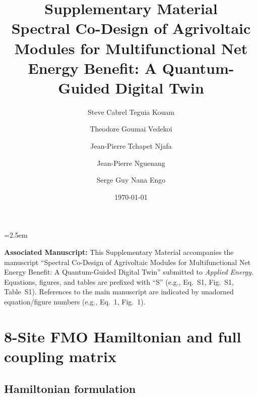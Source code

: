 \documentclass[11pt,a4paper]{article}
\begin{document}
\emergencystretch=2.5em

\title{\textbf{Supplementary Material}\\[0.5em]
\large Spectral Co-Design of Agrivoltaic Modules for Multifunctional Net Energy Benefit: A Quantum-Guided Digital Twin}

\author{Steve Cabrel Teguia Kouam}

\author{Theodore Goumai Vedekoi}
\author{Jean-Pierre Tchapet Njafa}
\author{Jean-Pierre Nguenang}
\author{Serge Guy Nana Engo}
\date{\today}

\maketitle

\noindent\textbf{Associated Manuscript:}
This Supplementary Material accompanies the manuscript ``Spectral Co-Design of Agrivoltaic Modules for Multifunctional Net Energy Benefit: A Quantum-Guided Digital Twin'' submitted to \textit{Applied Energy}. Equations, figures, and tables are prefixed with ``S'' (e.g., Eq.~S1, Fig.~S1, Table~S1). References to the main manuscript are indicated by unadorned equation/figure numbers (e.g., Eq.~1, Fig.~1).

\vspace{1em}

\tableofcontents

\newpage


\section{8-Site FMO Hamiltonian and full coupling matrix}
\label{SI-sec:hamiltonian}

\subsection{Hamiltonian formulation}
\end{document}
